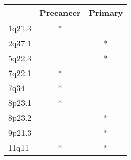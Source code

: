 \begin{tabular}{lcc}
\toprule
{} & Precancer & Primary \\
\midrule
1q21.3 &         * &         \\
2q37.1 &           &       * \\
5q22.3 &           &       * \\
7q22.1 &         * &         \\
7q34   &         * &         \\
8p23.1 &         * &         \\
8p23.2 &           &       * \\
9p21.3 &           &       * \\
11q11  &         * &       * \\
\bottomrule
\end{tabular}
